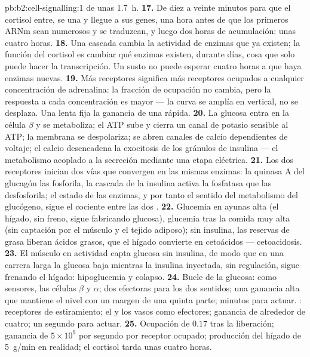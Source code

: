 \begin{solution}{pb:b2:cell-signalling:1}
de unas \qty{1.7}{h}.
\textbf{17.} De diez a veinte minutos para que el cortisol entre, se una y
llegue a sus genes, una hora antes de que los primeros ARNm sean
numerosos y se traduzcan, y luego dos horas de acumulación: unas cuatro
horas.
\textbf{18.} Una cascada cambia la actividad de enzimas que ya existen; la
función del cortisol es cambiar qué enzimas existen, durante días, cosa que
solo puede hacer la transcripción. Un susto no puede esperar cuatro horas
a que haya enzimas nuevas.
\textbf{19.} Más receptores significa más receptores ocupados a
cualquier concentración de adrenalina: la fracción de ocupación no
cambia, pero la respuesta a cada concentración es mayor --- la curva se
amplía en vertical, no se desplaza. Una  lenta fija la ganancia de
una rápida.
\textbf{20.} La glucosa entra en la célula $\beta$ y se metaboliza; el ATP
sube y cierra un canal de potasio sensible al ATP; la membrana se
despolariza; se abren canales de calcio dependientes de voltaje; el calcio
desencadena la exocitosis de los gránulos de insulina --- el metabolismo
acoplado a la secreción mediante una etapa eléctrica.
\textbf{21.} Los dos receptores inician dos vías que convergen en las
mismas enzimas: la quinasa A del glucagón las fosforila, la cascada de la
insulina activa la fosfatasa que las desfosforila; el estado de las
enzimas, y por tanto el sentido del metabolismo del glucógeno, sigue el
cociente entre las dos .
\textbf{22.} Glucemia en ayunas alta (el hígado, sin freno, sigue
fabricando glucosa), glucemia tras la comida muy alta (sin captación por
el músculo y el tejido adiposo); sin insulina, las reservas de grasa
liberan ácidos grasos, que el hígado convierte en cetoácidos ---
cetoacidosis.
\textbf{23.} El músculo en actividad capta glucosa sin insulina, de modo
que en una carrera larga la glucosa baja mientras la insulina inyectada,
sin regulación, sigue frenando el hígado: hipoglucemia y colapso.
\textbf{24.} Bucle de la glucosa: como sensores, las células $\beta$ y $\alpha$;
dos  efectoras para los dos sentidos; una ganancia alta que
mantiene el nivel con un margen de una quinta parte; minutos para actuar.
: receptores de estiramiento; el  y los vasos como
efectores; ganancia de alrededor de cuatro; un segundo para actuar.
\textbf{25.} Ocupación de $0.17$ tras la liberación; ganancia de $5\times 10^{9}$
por segundo por receptor ocupado; producción del hígado de
\qty{5}{g/min} en realidad; el cortisol tarda unas cuatro horas.
\end{solution}

